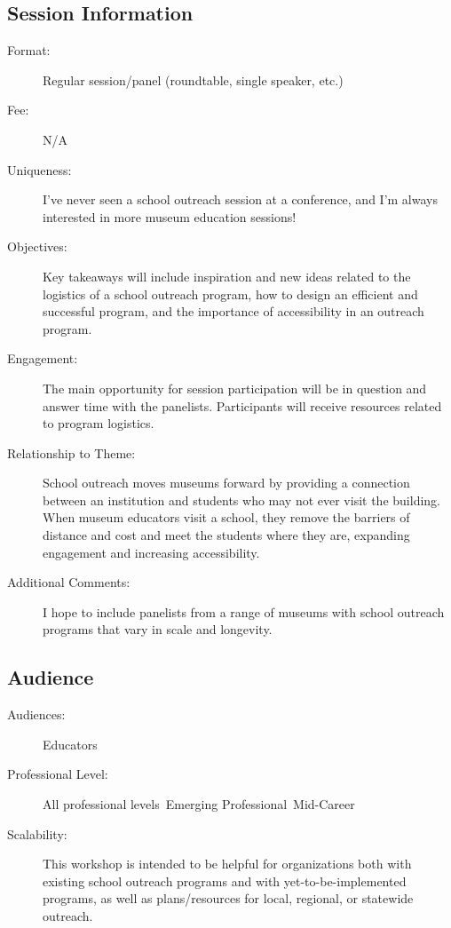 \documentclass{report}
\begin{document}
              \subsection*{Session Information}
                \begin{description}
                  \item [Format:] Regular session/panel (roundtable, single speaker, etc.)
							    
								  \item [Fee:]N/A
							     
							    \item [Uniqueness:]I've never seen a school outreach session at a conference, and I'm always interested in more museum education sessions!
							    \item [Objectives:]Key takeaways will include inspiration and new ideas related to the logistics of a school outreach program, how to design an efficient and successful program, and the importance of accessibility in an outreach program.
							    \item [Engagement:]The main opportunity for session participation will be in question and answer time with the panelists. Participants will receive resources related to program logistics.
							    \item [Relationship to Theme:]School outreach moves museums forward by providing a connection between an institution and students who may not ever visit the building. When museum educators visit a school, they remove the barriers of distance and cost and meet the students where they are, expanding engagement and increasing accessibility.
							    
                    \item [Additional Comments: ]I hope to include panelists from a range of museums with school outreach programs that vary in scale and longevity. 

                \end{description}
              \subsection*{Audience}
                \begin{description}
                  \item [Audiences:]Educators~
                  \item[Professional Level:]All professional levels~Emerging Professional~Mid-Career~
                \item[Scalability:] This workshop is intended to be helpful for organizations both with existing school outreach programs and with yet-to-be-implemented programs, as well as plans/resources for local, regional, or statewide outreach.

							
              \end{description}
\end{document}
